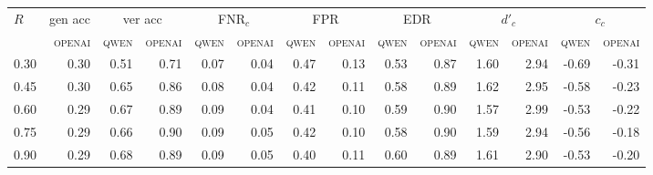 \begin{tabular}{l*{13}{r}}
\toprule
$R$ & \multicolumn{1}{c}{gen acc} & \multicolumn{2}{c}{ver acc} & \multicolumn{2}{c}{FNR$_c$} & \multicolumn{2}{c}{FPR} & \multicolumn{2}{c}{EDR} & \multicolumn{2}{c}{$d'_c$} & \multicolumn{2}{c}{$c_c$} \\
\cmidrule(lr){2-2} \cmidrule(lr){3-4} \cmidrule(lr){5-6} \cmidrule(lr){7-8} \cmidrule(lr){9-10} \cmidrule(lr){11-12} \cmidrule(lr){13-14}
 & \textsc{openai} & \textsc{qwen} & \textsc{openai} & \textsc{qwen} & \textsc{openai} & \textsc{qwen} & \textsc{openai} & \textsc{qwen} & \textsc{openai} & \textsc{qwen} & \textsc{openai} & \textsc{qwen} & \textsc{openai} \\
\midrule
0.30 & 0.30 & 0.51 & 0.71 & 0.07 & 0.04 & 0.47 & 0.13 & 0.53 & 0.87 & 1.60 & 2.94 & -0.69 & -0.31 \\
0.45 & 0.30 & 0.65 & 0.86 & 0.08 & 0.04 & 0.42 & 0.11 & 0.58 & 0.89 & 1.62 & 2.95 & -0.58 & -0.23 \\
0.60 & 0.29 & 0.67 & 0.89 & 0.09 & 0.04 & 0.41 & 0.10 & 0.59 & 0.90 & 1.57 & 2.99 & -0.53 & -0.22 \\
0.75 & 0.29 & 0.66 & 0.90 & 0.09 & 0.05 & 0.42 & 0.10 & 0.58 & 0.90 & 1.59 & 2.94 & -0.56 & -0.18 \\
0.90 & 0.29 & 0.68 & 0.89 & 0.09 & 0.05 & 0.40 & 0.11 & 0.60 & 0.89 & 1.61 & 2.90 & -0.53 & -0.20 \\
\bottomrule
\end{tabular}
